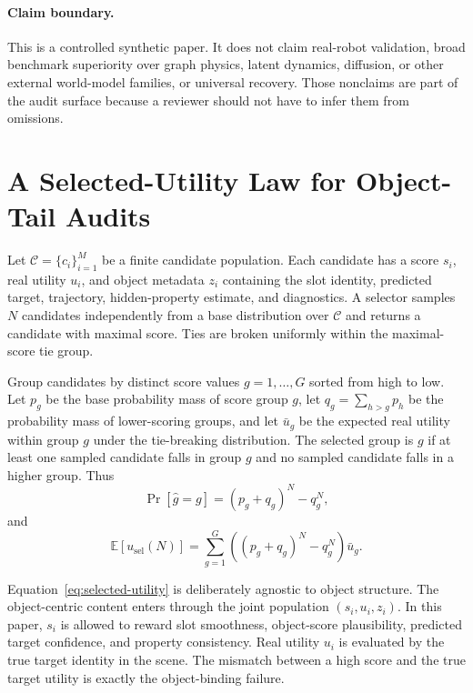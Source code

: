 \documentclass[10pt]{article}
\begin{document}
\paragraph{Claim boundary.}
This is a controlled synthetic paper. It does not claim real-robot validation, broad benchmark superiority over graph physics, latent dynamics, diffusion, or other external world-model families, or universal recovery. Those nonclaims are part of the audit surface because a reviewer should not have to infer them from omissions.

\section{A Selected-Utility Law for Object-Tail Audits}

Let $\mathcal{C}=\{c_i\}_{i=1}^{M}$ be a finite candidate population. Each candidate has a score $s_i$, real utility $u_i$, and object metadata $z_i$ containing the slot identity, predicted target, trajectory, hidden-property estimate, and diagnostics. A selector samples $N$ candidates independently from a base distribution over $\mathcal{C}$ and returns a candidate with maximal score. Ties are broken uniformly within the maximal-score tie group.

Group candidates by distinct score values $g=1,\ldots,G$ sorted from high to low. Let $p_g$ be the base probability mass of score group $g$, let $q_g=\sum_{h>g}p_h$ be the probability mass of lower-scoring groups, and let $\bar{u}_g$ be the expected real utility within group $g$ under the tie-breaking distribution. The selected group is $g$ if at least one sampled candidate falls in group $g$ and no sampled candidate falls in a higher group. Thus
\begin{equation}
  \Pr[\hat{g}=g] = (p_g+q_g)^N - q_g^N,
\end{equation}
and
\begin{equation}
  \mathbb{E}[u_{\mathrm{sel}}(N)] =
  \sum_{g=1}^{G} \left((p_g+q_g)^N-q_g^N\right)\bar{u}_g.
  \label{eq:selected-utility}
\end{equation}

Equation~\ref{eq:selected-utility} is deliberately agnostic to object structure. The object-centric content enters through the joint population $(s_i,u_i,z_i)$. In this paper, $s_i$ is allowed to reward slot smoothness, object-score plausibility, predicted target confidence, and property consistency. Real utility $u_i$ is evaluated by the true target identity in the scene. The mismatch between a high score and the true target utility is exactly the object-binding failure.
\end{document}
